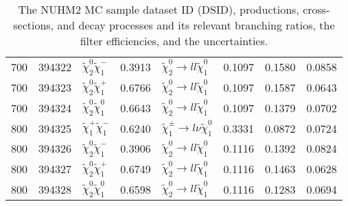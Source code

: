 \begin{table}[htb]
{{\begin{tabular}{llllllll}
                700             & 394322 & $\widetilde{\chi}^{0}_{2}\widetilde{\chi}^{-}_{1}$ & 0.3913              & $\widetilde{\chi}^{0}_{2} \rightarrow l l \widetilde{\chi}^{0}_{1}$     &  0.1097      &  0.1580           &  0.0858\\
                700             & 394323 & $\widetilde{\chi}^{0}_{2}\widetilde{\chi}^{+}_{1}$ & 0.6766              & $\widetilde{\chi}^{0}_{2} \rightarrow l l \widetilde{\chi}^{0}_{1}$     &  0.1097      &  0.1587          &  0.0643\\
                700             & 394324 & $\widetilde{\chi}^{0}_{2}\widetilde{\chi}^{0}_{1}$ & 0.6643              & $\widetilde{\chi}^{0}_{2} \rightarrow l l \widetilde{\chi}^{0}_{1}$     &  0.1097      &  0.1379           &  0.0702\\
                \hline
                800             & 394325 & $\widetilde{\chi}^{+}_{1}\widetilde{\chi}^{-}_{1}$ & 0.6240              & $\widetilde{\chi}^{\pm}_{1} \rightarrow l \nu \widetilde{\chi}^{0}_{1}$ &  0.3331      &  0.0872           &  0.0724\\
                800             & 394326 & $\widetilde{\chi}^{0}_{2}\widetilde{\chi}^{-}_{1}$ & 0.3906              & $\widetilde{\chi}^{0}_{2} \rightarrow l l \widetilde{\chi}^{0}_{1}$     &  0.1116      &  0.1392           &  0.0824\\
                800             & 394327 & $\widetilde{\chi}^{0}_{2}\widetilde{\chi}^{+}_{1}$ & 0.6749              & $\widetilde{\chi}^{0}_{2} \rightarrow l l \widetilde{\chi}^{0}_{1}$     &  0.1116      &  0.1463           &  0.0628\\
                800             & 394328 & $\widetilde{\chi}^{0}_{2}\widetilde{\chi}^{0}_{1}$ & 0.6598              & $\widetilde{\chi}^{0}_{2} \rightarrow l l \widetilde{\chi}^{0}_{1}$     &  0.1116      &  0.1283           &  0.0694\\
                \hline
                \hline
            \end{tabular}
        }
    }
    \caption{The NUHM2 MC sample dataset ID (DSID), productions, cross-sections, and decay processes and its relevant branching ratios, the filter efficiencies, and the uncertainties.}
    \label{tab:data_NUHM2_mcprod}
\end{table}%
